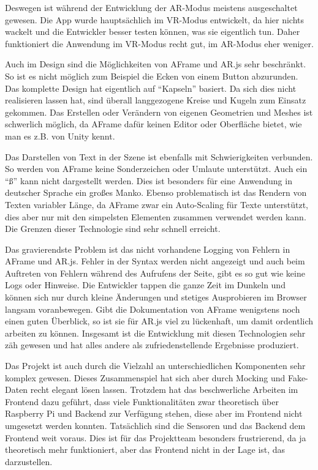 Deswegen ist während der Entwicklung der AR-Modus meistens ausgeschaltet
gewesen. Die App wurde hauptsächlich im VR-Modus entwickelt, da hier
nichts wackelt und die Entwickler besser testen können, was sie
eigentlich tun. Daher funktioniert die Anwendung im VR-Modus recht gut,
im AR-Modus eher weniger.

Auch im Design sind die Möglichkeiten von AFrame und AR.js sehr
beschränkt. So ist es nicht möglich zum Beispiel die Ecken von einem
Button abzurunden. Das komplette Design hat eigentlich auf ``Kapseln''
basiert. Da sich dies nicht realisieren lassen hat, sind überall
langgezogene Kreise und Kugeln zum Einsatz gekommen. Das Erstellen oder
Verändern von eigenen Geometrien und Meshes ist schwerlich möglich, da
AFrame dafür keinen Editor oder Oberfläche bietet, wie man es z.B. von
Unity kennt.

Das Darstellen von Text in der Szene ist ebenfalls mit Schwierigkeiten
verbunden. So werden von AFrame keine Sonderzeichen oder Umlaute
unterstützt. Auch ein ``ß'' kann nicht dargestellt werden. Dies ist
besonders für eine Anwendung in deutscher Sprache ein großes Manko.
Ebenso problematisch ist das Rendern von Texten variabler Länge, da
AFrame zwar ein Auto-Scaling für Texte unterstützt, dies aber nur mit
den simpelsten Elementen zusammen verwendet werden kann. Die Grenzen
dieser Technologie sind sehr schnell erreicht.

Das gravierendste Problem ist das nicht vorhandene Logging von Fehlern
in AFrame und AR.js. Fehler in der Syntax werden nicht angezeigt und
auch beim Auftreten von Fehlern während des Aufrufens der Seite, gibt es
so gut wie keine Logs oder Hinweise. Die Entwickler tappen die ganze
Zeit im Dunkeln und können sich nur durch kleine Änderungen und stetiges
Ausprobieren im Browser langsam voranbewegen. Gibt die Dokumentation von
AFrame wenigstens noch einen guten Überblick, so ist sie für AR.js viel
zu lückenhaft, um damit ordentlich arbeiten zu können. Insgesamt ist die
Entwicklung mit diesen Technologien sehr zäh gewesen und hat alles
andere als zufriedenstellende Ergebnisse produziert.

Das Projekt ist auch durch die Vielzahl an unterschiedlichen Komponenten
sehr komplex gewesen. Dieses Zusammenspiel hat sich aber durch Mocking
und Fake-Daten recht elegant lösen lassen. Trotzdem hat das
beschwerliche Arbeiten im Frontend dazu geführt, dass viele
Funktionalitäten zwar theoretisch über Raspberry Pi und Backend zur
Verfügung stehen, diese aber im Frontend nicht umgesetzt werden konnten.
Tatsächlich sind die Sensoren und das Backend dem Frontend weit voraus.
Dies ist für das Projektteam besonders frustrierend, da ja theoretisch
mehr funktioniert, aber das Frontend nicht in der Lage ist, das
darzustellen.

